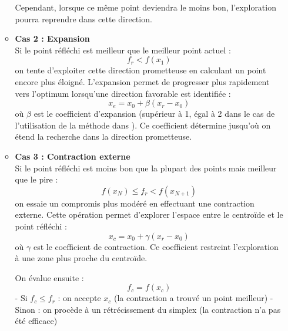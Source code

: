 \begin{enumerate}
\begin{itemize}
       \begin{InfoBox}
            Cependant, lorsque ce même point deviendra le moins bon, l'exploration pourra reprendre dans cette direction.
       \end{InfoBox}

\vspace{1em}
    
       \item \textbf{Cas 2 : Expansion} \\
       Si le point réfléchi est meilleur que le meilleur point actuel :
       \begin{equation}
       f_r < f(x_1)
       \end{equation}
       on tente d'exploiter cette direction prometteuse en calculant un point encore plus éloigné. L'expansion permet de progresser plus rapidement vers l'optimum lorsqu'une direction favorable est identifiée :
       \begin{equation}
       x_e = x_0 + \beta (x_r - x_0)
       \end{equation}
       où $\beta$ est le coefficient d'expansion (supérieur à 1, égal à 2 dans le cas de l'utilisation de la méthode  dans ). Ce coefficient détermine jusqu'où on étend la recherche dans la direction prometteuse.
       
\vspace{1em}
    
       \item \textbf{Cas 3 : Contraction externe} \\
       Si le point réfléchi est moins bon que la plupart des points mais meilleur que le pire :
       \begin{equation}
       f(x_N) \leq f_r < f(x_{N+1})
       \end{equation}
       on essaie un compromis plus modéré en effectuant une contraction externe. Cette opération permet d'explorer l'espace entre le centroïde et le point réfléchi :
       \begin{equation}
       x_c = x_0 + \gamma (x_r - x_0)
       \end{equation}
       où $\gamma$ est le coefficient de contraction. Ce coefficient restreint l'exploration à une zone plus proche du centroïde.
       
       On évalue ensuite :
       \begin{equation}
       f_c = f(x_c)
       \end{equation}
       - Si $f_c \leq f_r$ : on accepte $x_c$ (la contraction a trouvé un point meilleur)
       - Sinon : on procède à un rétrécissement du simplex (la contraction n'a pas été efficace)


\end{itemize}
\end{enumerate}
